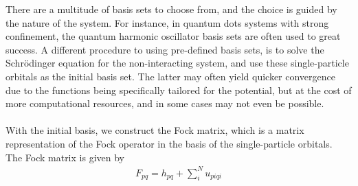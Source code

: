 \documentclass{subfiles}
\begin{document}
There are a multitude of basis sets to choose from, and the choice is guided by the nature of the system. For instance, in quantum dots systems with strong confinement, the quantum harmonic oscillator basis sets are often used to great success\cite{Yuan_2017}. A different procedure to using pre-defined basis sets, is to solve the Schrödinger equation for the non-interacting system, and use these single-particle orbitals as the initial basis set. The latter may often yield quicker convergence due to the functions being specifically tailored for the potential, but at the cost of more computational resources, and in some cases may not even be possible. 
\\
\\ With the initial basis, we construct the Fock matrix, which is a matrix representation of the Fock operator in the basis of the single-particle orbitals. The Fock matrix is given by
\begin{align*}
    F_{pq} = h_{pq} + \sum_{i}^N u_{piqi}
\end{align*}
\end{document}
